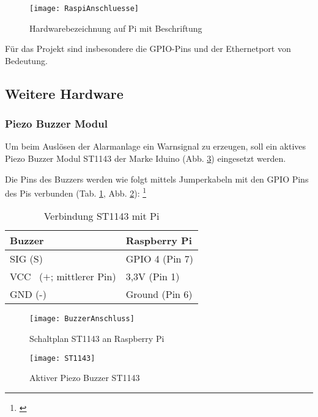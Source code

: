 	\begin{figure}[H]
		\centering
		\texttt{[image: RaspiAnschluesse]}
		\caption{Hardwarebezeichnung auf Pi mit Beschriftung \cite{notebooksbilliger.deAG.21.04.2022}}
		\label{RaspiAnschluesse}
	\end{figure}
	
Für das Projekt sind insbesondere die GPIO-Pins und der Ethernetport von Bedeutung.\par

\newpage

\subsection{Weitere Hardware}
\subsubsection{Piezo Buzzer Modul}
	Um beim Auslösen der Alarmanlage ein Warnsignal zu erzeugen, soll ein aktives Piezo Buzzer Modul ST1143 der Marke Iduino (Abb. \ref{ST1143}) eingesetzt werden.\par Die Pins des Buzzers werden wie folgt mittels Jumperkabeln mit den GPIO Pins des Pis verbunden (Tab. \ref{BuzzerTabelle}, Abb. \ref{BuzzerAnschluss}): \footnote{\cite{Draeger.2019}}
	
	\begin{table}[H]
		\centering
		\begin{tabular}{|p{5cm}|p{5cm}|} 
			\hline
			Buzzer & Raspberry Pi\\ 
			\hline
			SIG (S)   & GPIO 4 \hspace{0,1cm}(Pin 7)\\  
			\hline
			VCC~ ($+$; mittlerer Pin)   & 3,3V 	\hspace{0,7cm}(Pin 1)\\
			\hline
			GND (-)    & Ground  	\hspace{0,2cm}(Pin 6)\\
			\hline
		\end{tabular}
	\caption{Verbindung ST1143 mit Pi}
	\label{BuzzerTabelle}
	\end{table} 

	\begin{figure}[H]
	\centering
	\texttt{[image: BuzzerAnschluss]}
	\caption{Schaltplan ST1143 an Raspberry Pi}
	\label{BuzzerAnschluss}
	\end{figure}

	\begin{figure}[H]	%
	\centering
	\texttt{[image: ST1143]}
	\caption{Aktiver Piezo Buzzer ST1143 \cite{reicheltelektronikGmbH&amp.21.04.2022}}
	\label{ST1143}
	\end{figure}


